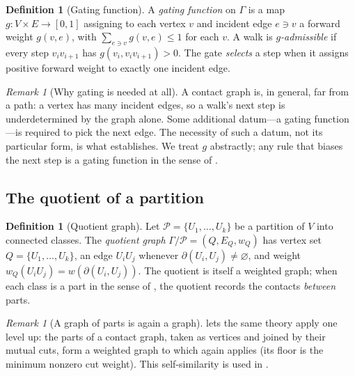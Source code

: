 \documentclass[11pt,a4paper]{article}
\theoremstyle{thmstyle}
\theoremstyle{definition}
\newtheorem{definition}[theorem]{Definition}
\theoremstyle{remark}
\newtheorem{remark}[theorem]{Remark}
\newcommand{\Gph}{\Gamma}                 %
\newcommand{\V}{V}                        %
\newcommand{\E}{E}                        %
\newcommand{\wt}{w}                       %
\newcommand{\cut}{\partial}               %
\newcommand{\gate}{g}                     %
\newcommand{\Quot}{Q}                     %
\begin{document}
\begin{definition}[Gating function]
\label{def:gate}
A \emph{gating function} on $\Gph$ is a map
$\gate\colon\V\times\E\to[0,1]$ assigning to each vertex $v$ and incident edge
$e\ni v$ a forward weight $\gate(v,e)$, with $\sum_{e\ni v}\gate(v,e)\le 1$ for
each $v$. A walk is \emph{$\gate$-admissible} if every step $v_iv_{i+1}$ has
$\gate(v_i,v_iv_{i+1})>0$. The gate \emph{selects} a step when it assigns
positive forward weight to exactly one incident edge.
\end{definition}

\begin{remark}[Why gating is needed at all]
\label{rem:gate-need}
A contact graph is, in general, far from a path: a vertex has many incident
edges, so a walk's next step is underdetermined by the graph alone. Some
additional datum---a gating function---is required to pick the next edge. The
necessity of such a datum, not its particular form, is what
 establishes. We treat $\gate$ abstractly; any rule that biases
the next step is a gating function in the sense of .
\end{remark}

\subsection{The quotient of a partition}

\begin{definition}[Quotient graph]
\label{def:quotient}
Let $\mathcal{P}=\{U_1,\dots,U_k\}$ be a partition of $\V$ into connected
classes. The \emph{quotient graph} $\Gph/\mathcal{P}=(\Quot,\E_{\Quot},\wt_{\Quot})$
has vertex set $\Quot=\{U_1,\dots,U_k\}$, an edge $U_iU_j$ whenever
$\cut(U_i,U_j)\neq\varnothing$, and weight
$\wt_{\Quot}(U_iU_j)=\wt(\cut(U_i,U_j))$. The quotient is itself a weighted
graph; when each class is a part in the sense of , the
quotient records the contacts \emph{between} parts.
\end{definition}

\begin{remark}[A graph of parts is again a graph]
\label{rem:quotient}
 lets the same theory apply one level up: the parts of a
contact graph, taken as vertices and joined by their mutual cuts, form a
weighted graph to which  again applies (its floor is the
minimum nonzero cut weight). This self-similarity is used in
.
\end{remark}
\end{document}

